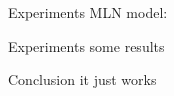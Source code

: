 \documentclass[]{beamer}
\begin{document}
\begin{frame}{Experiments}
MLN model:


\end{frame}

\begin{frame}{Experiments}
some results


\end{frame}


\begin{frame}{Conclusion}
it just works
\end{frame}
\end{document}
